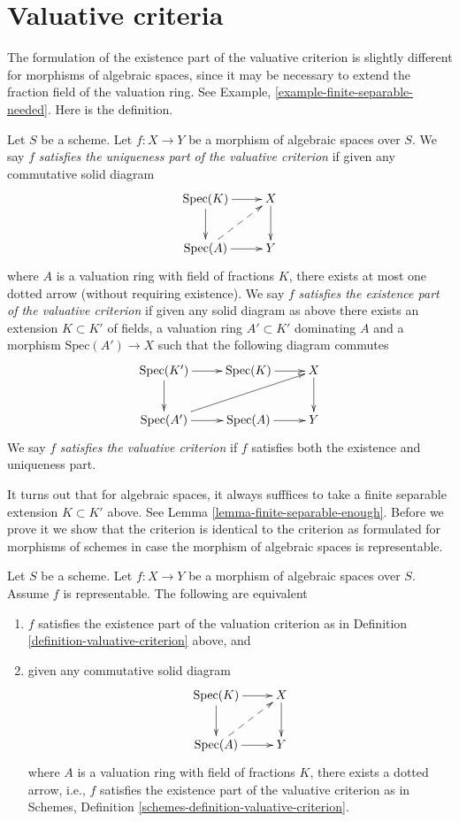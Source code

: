 \section{Valuative criteria}
\label{section-valuative}

\noindent
The formulation of the existence part of the valuative criterion is
slightly different for morphisms of algebraic spaces, since it may be
necessary to extend the fraction field of the valuation ring.
See Example, \ref{example-finite-separable-needed}. Here is the definition.

\begin{definition}
\label{definition-valuative-criterion}
Let $S$ be a scheme.
Let $f : X \to Y$ be a morphism of algebraic spaces over $S$.
We say $f$ {\it satisfies the uniqueness part of the valuative criterion}
if given any commutative solid diagram
$$
\xymatrix{
\text{Spec}(K) \ar[r] \ar[d] & X \ar[d] \\
\text{Spec}(A) \ar[r] \ar@{-->}[ru] & Y
}
$$
where $A$ is a valuation ring with field of fractions $K$, there exists
at most one dotted arrow (without requiring existence).
We say $f$ {\it satisfies the existence part of the valuative criterion}
if given any solid diagram as above there exists an extension
$K \subset K'$ of fields, a valuation ring $A' \subset K'$ dominating
$A$ and a morphism $\text{Spec}(A') \to X$ such that the following
diagram commutes
$$
\xymatrix{
\text{Spec}(K') \ar[r] \ar[d] & \text{Spec}(K) \ar[r] & X \ar[d] \\
\text{Spec}(A') \ar[r] \ar[rru] &\text{Spec}(A) \ar[r] & Y
}
$$
We say $f$ {\it satisfies the valuative criterion}
if $f$ satisfies both the existence and uniqueness part.
\end{definition}

\noindent
It turns out that for algebraic spaces, it always sufffices to
take a finite separable extension $K \subset K'$ above.
See Lemma \ref{lemma-finite-separable-enough}.
Before we prove it we show that the criterion
is identical to the criterion as formulated for morphisms of schemes
in case the morphism of algebraic spaces is representable.

\begin{lemma}
\label{lemma-valuative-criterion-representable}
Let $S$ be a scheme.
Let $f : X \to Y$ be a morphism of algebraic spaces over $S$.
Assume $f$ is representable. The following are equivalent
\begin{enumerate}
\item $f$ satisfies the existence part of the valuation criterion
as in Definition \ref{definition-valuative-criterion} above, and
\item given any commutative solid diagram
$$
\xymatrix{
\text{Spec}(K) \ar[r] \ar[d] & X \ar[d] \\
\text{Spec}(A) \ar[r] \ar@{-->}[ru] & Y
}
$$
where $A$ is a valuation ring with field of fractions $K$, there exists
a dotted arrow, i.e., $f$ satisfies the existence part of the valuative
criterion as in
Schemes, Definition \ref{schemes-definition-valuative-criterion}.
\end{enumerate}
\end{lemma}

